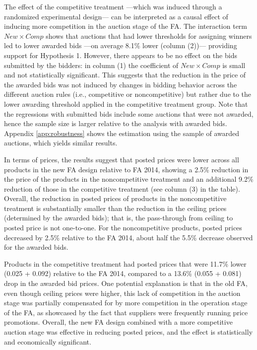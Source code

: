  The effect of the competitive treatment ---which was induced through a randomized experimental design--- can be interpreted as a causal effect of inducing more competition in the auction stage of the FA. The interaction term $New\times Comp$ shows that auctions that had lower thresholds for assigning winners led to lower awarded bids ---on average 8.1\% lower (column (2))--- providing support for Hypothesis 1. However, there appears to be no effect on the bids submitted by the bidders: in column (1) the coefficient of $New\times Comp$  is small and not statistically significant. This suggests that the reduction in the price of the awarded bids was not induced by changes in bidding behavior across the different auction rules (i.e., competitive or noncompetitive) but rather due to the lower awarding threshold applied in the competitive treatment group. {Note that the regressions with submitted bids include some auctions that were not awarded, hence the sample size is larger relative to the analysis with awarded bids. Appendix \ref{app:robustness} shows the estimation using the sample of awarded auctions, which yields similar results.}

In terms of prices, the results suggest that posted prices were lower across all products in the new FA design relative to FA 2014, showing a 2.5\% reduction in the price of the products in the noncompetitive treatment and an additional 9.2\% reduction of those in the competitive treatment {(see column (3) in the table)}. Overall, the reduction in posted prices of products in the noncompetitive treatment is substantially smaller than the reduction in the ceiling prices (determined by the awarded bids); that is, the pass-through from ceiling to posted price is not one-to-one. 
For the noncompetitive products, posted prices decreased by 2.5\% relative to the FA 2014, about half the 5.5\% decrease observed for the awarded bids. 

Products in the competitive treatment had posted prices that were 11.7\% lower (0.025 + 0.092) relative to the FA 2014, compared to a 13.6\% (0.055 + 0.081) drop in the awarded bid prices. One potential explanation is that in the old FA, even though ceiling prices were higher, this lack of competition in the auction stage was partially compensated for by more competition in the operation stage of the FA, as showcased by the fact that suppliers were frequently running price promotions. Overall, the new FA design combined with a more competitive auction stage was effective in reducing posted prices, and the effect is statistically and economically significant.

